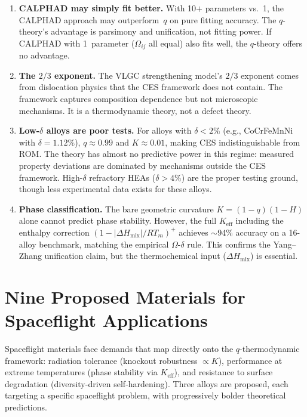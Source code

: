 \documentclass[12pt,letterpaper]{article}
\theoremstyle{definition}
\begin{document}
\begin{enumerate}
  \item \textbf{CALPHAD may simply fit better.}  With 10$+$ parameters vs.~1, the CALPHAD approach may outperform~$q$ on pure fitting accuracy.  The $q$-theory's advantage is parsimony and unification, not fitting power.  If CALPHAD with 1~parameter ($\Omega_{ij}$ all equal) also fits well, the $q$-theory offers no advantage.

  \item \textbf{The $2/3$ exponent.}  The VLGC strengthening model's $2/3$ exponent comes from dislocation physics that the CES framework does not contain.  The framework captures composition dependence but not microscopic mechanisms.  It is a thermodynamic theory, not a defect theory.

  \item \textbf{Low-$\delta$ alloys are poor tests.}  For alloys with $\delta < 2\%$ (e.g., CoCrFeMnNi with $\delta = 1.12\%$), $q \approx 0.99$ and $K \approx 0.01$, making CES indistinguishable from ROM.  The theory has almost no predictive power in this regime: measured property deviations are dominated by mechanisms outside the CES framework.  High-$\delta$ refractory HEAs ($\delta > 4\%$) are the proper testing ground, though less experimental data exists for these alloys.

  \item \textbf{Phase classification.}  The bare geometric curvature $K = (1-q)(1-H)$ alone cannot predict phase stability.  However, the full $K_{\mathrm{eff}}$ including the enthalpy correction $(1 - |\Delta H_{\mathrm{mix}}|/RT_m)^+$ achieves $\sim$94\% accuracy on a 16-alloy benchmark, matching the empirical $\Omega$-$\delta$ rule.  This confirms the Yang--Zhang unification claim, but the thermochemical input ($\Delta H_{\mathrm{mix}}$) is essential.
\end{enumerate}


\section{Nine Proposed Materials for Spaceflight Applications}

Spaceflight materials face demands that map directly onto the $q$-thermodynamic framework: radiation tolerance (knockout robustness $\propto K$), performance at extreme temperatures (phase stability via $K_{\mathrm{eff}}$), and resistance to surface degradation (diversity-driven self-hardening).  Three alloys are proposed, each targeting a specific spaceflight problem, with progressively bolder theoretical predictions.
\end{document}
